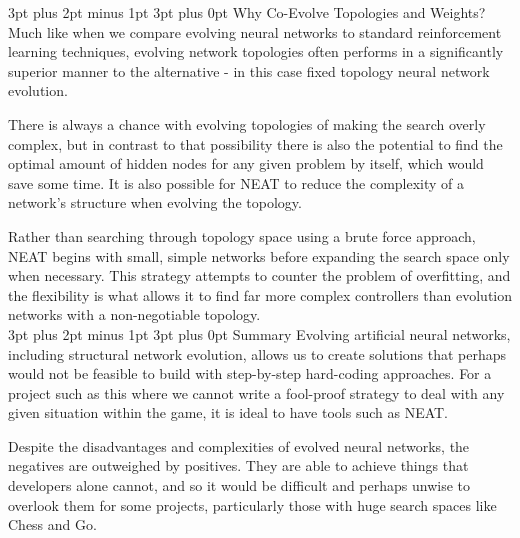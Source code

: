 \documentclass[12pt,a4paper]{article}
\makeatletter
\renewcommand\subsection{\@startsection {subsection}{1}{2mm} %
                               {3pt plus 2pt minus 1pt} %
                               {3pt plus 0pt} %
                               {\normalfont\bfseries}}
\makeatother
\begin{document}
\subsection{Why Co-Evolve Topologies and Weights?}
Much like when we compare evolving neural networks to standard reinforcement learning techniques, evolving network topologies often performs in a significantly superior manner to the alternative - in this case fixed topology neural network evolution\citep{EfficientEvolutionOfNeuralNetworkTopologies}. 

There is always a chance with evolving topologies of making the search overly complex, but in contrast to that possibility there is also the potential to find the optimal amount of hidden nodes for any given problem by itself, which would save some time\citep{EfficientEvolutionOfNeuralNetworkTopologies}. It is also possible for NEAT to reduce the complexity of a network's structure when evolving the topology. 

Rather than searching through topology space using a brute force approach, NEAT begins with small, simple networks before expanding the search space only when necessary\citep{EvolvingARovingEyeForGo}. This strategy attempts to counter the problem of overfitting, and the flexibility is what allows it to find far more complex controllers than evolution networks with a non-negotiable topology.\\


\subsection{Summary}
Evolving artificial neural networks, including structural network evolution, allows us to create solutions that perhaps would not be feasible to build with step-by-step hard-coding approaches. For a project such as this where we cannot write a fool-proof strategy to deal with any given situation within the game, it is ideal to have tools such as NEAT. 

Despite the disadvantages and complexities of evolved neural networks, the negatives are outweighed by positives. They are able to achieve things that developers alone cannot, and so it would be difficult and perhaps unwise to overlook them for some projects, particularly those with huge search spaces like Chess and Go.  
\end{document}
